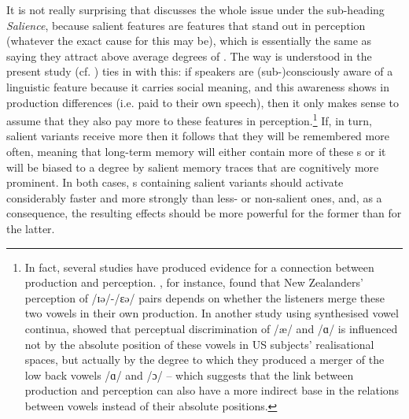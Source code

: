 It is not really surprising that \textcite{pierrehumbert2006} discusses the whole issue under the sub-heading \emph{Salience}, because salient features are features that stand out in perception (whatever the exact cause for this may be), which is essentially the same as saying they attract above average degrees of .
The way  is understood in the present study (cf. ) ties in with this: if speakers are (sub-)consciously aware of a linguistic feature because it carries social meaning, and this awareness shows in production differences (i.e.  paid to their own speech), then it only makes sense to assume that they also pay more  to these features in perception.\footnote{In fact, several studies have produced evidence for a connection between production and perception. \cite{hayetal2006b}, for instance, found that New Zealanders' perception of /ɪə/-/ɛə/ pairs depends on whether the listeners merge these two vowels in their own production. In another study using synthesised vowel continua, \textcite{kendallfridland2017} showed that perceptual discrimination of /æ/ and /ɑ/ is influenced not by the absolute position of these vowels in US subjects' realisational spaces, but actually by the degree to which they produced a merger of the low back vowels /ɑ/ and /ɔ/ -- which suggests that the link between production and perception can also have a more indirect base in the relations between vowels instead of their absolute positions.}
If, in turn, salient variants receive more  then it follows that they will be remembered more often, meaning that long-term memory will either contain more of these s or it will be biased to a degree by salient memory traces that are cognitively more prominent.
In both cases, s containing salient variants should activate considerably faster and more strongly than less- or non-salient ones, and, as a consequence, the resulting  effects should be more powerful for the former than for the latter.

